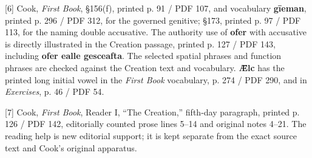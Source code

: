 [6] Cook, \emph{First Book}, §156(f), printed p. 91 /\allowbreak{} PDF 107, and vocabulary \textbf{gīeman}, printed p. 296 /\allowbreak{} PDF 312, for the governed genitive; §173, printed p. 97 /\allowbreak{} PDF 113, for the naming double accusative. The authority use of \textbf{ofer} with accusative is directly illustrated in the Creation passage, printed p. 127 /\allowbreak{} PDF 143, including \textbf{ofer ealle gesceafta}. The selected spatial phrases and function phrases are checked against the Creation text and vocabulary. \textbf{Ǣlc} has the printed long initial vowel in the \emph{First Book} vocabulary, p. 274 /\allowbreak{} PDF 290, and in \emph{Exercises}, p. 46 /\allowbreak{} PDF 54.

[7] Cook, \emph{First Book}, Reader I, “The Creation,” fifth-day paragraph, printed p. 126 /\allowbreak{} PDF 142, editorially counted prose lines 5–14 and original notes 4–21. The reading help is new editorial support; it is kept separate from the exact source text and Cook’s original apparatus.

\endgroup

